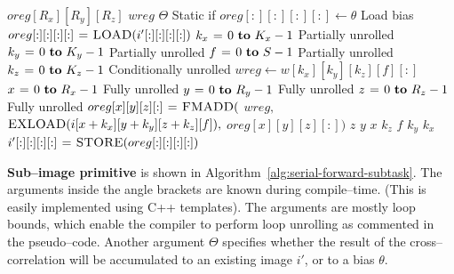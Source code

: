   \begin{algorithm}
    {\footnotesize
      \begin{codebox}
        \li {} $oreg[R_x][R_y][R_z]$
        \li {} $wreg$
        \li \If $\Theta$ \Comment Static if
        \li \Then $oreg[:][:][:][:] \gets \theta$ \Comment Load bias
        \li \Else
        \li       $oreg[:][:][:][:] \mathrel{\hspace{1pt}=\hspace{1pt}} \textnormal{\scshape LOAD}(i'[:][:][:][:])$
        \End \li {}
        \li {} $k_x \gets 0 \To K_x-1$ \Comment Partially unrolled
        \li   \Do {} $k_y \gets 0 \To K_y-1$  \Comment Partially unrolled
        \li     \Do {} $f \gets 0 \To S - 1$ \Comment Partially unrolled
        \li       \Do {} $k_z \gets 0 \To K_z-1$  \Comment Conditionally unrolled
        \li         \Do $wreg \gets w[k_x][k_y][k_z][f][:]$
        \li {} $x \gets 0 \To R_x-1$ \Comment Fully unrolled
        \li   \Do {} $y \gets 0 \To R_y-1$ \Comment Fully unrolled
        \li      \Do {} $z \gets 0 \To R_z-1$ \Comment Fully unrolled
        \li         \Do $oreg[x][y][z][:] \mathrel{\hspace{1pt}=\hspace{1pt}} \textnormal{\scshape FMADD}($
        \li       $wreg,$
        \li       $\textnormal{\scshape EXLOAD}(i[x+k_x][y+k_y][z+k_z][f]),$
        \li       $oreg[x][y][z][:])$
        \End \li {} $z$
        \End \li {} $y$
        \End \li {} $x$
        \End \li {} $k_z$
        \End \li {} $f$
        \End \li {} $k_y$
        \End \li {} $k_x$
        \li $i'[:][:][:][:] \mathrel{\hspace{1pt}=\hspace{1pt}} \textnormal{\scshape STORE}(oreg[:][:][:][:])$
      \end{codebox}
    \caption{The finest granularity primitive that computes a
      sub--image of size $R_x \times R_y \times R_z$ of $S$ images by
      performing $S^2$ cross--correlations on $S$ input images with
      kernels of size $K_x \times K_y \times K_z$.}
    \label{alg:serial-forward-subtask}
    }
  \end{algorithm}

  {\bf Sub--image primitive} is shown in
  Algorithm~\ref{alg:serial-forward-subtask}.  The arguments inside
  the angle brackets are known during compile--time.  (This is easily
  implemented using C++ templates).  The arguments are mostly loop
  bounds, which enable the compiler to perform loop unrolling as
  commented in the pseudo--code.  Another argument $\Theta$ specifies
  whether the result of the cross--correlation will be accumulated to
  an existing image $i'$, or to a bias $\theta$.

